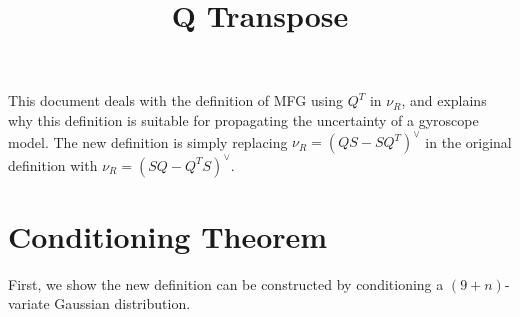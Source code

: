 \documentclass[10pt,twocolumn]{article}
\title{\vspace{-4ex}\textbf{Q Transpose\vspace{-4ex}}}
\date{}
\begin{document}
\maketitle

This document deals with the definition of MFG using $Q^T$ in $\nu_R$, and explains why this definition is suitable for propagating the uncertainty of a gyroscope model.
The new definition is simply replacing $\nu_R = (QS-SQ^T)^\vee$ in the original definition with $\nu_R = (SQ-Q^TS)^\vee$.

\section{Conditioning Theorem}

First, we show the new definition can be constructed by conditioning a $(9+n)$-variate Gaussian distribution.
\end{document}
